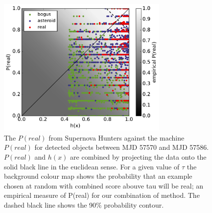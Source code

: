 \documentclass[a4paper,fleqn,usenatbib]{mnras}
\begin{document}
\begin{figure}
   \includegraphics[width=84mm]{figs/human_v_machine_20160712-20160718.pdf}
   \caption{The $P(real)$ from Supernova Hunters against the machine $P(real)$ for detected 
            objects between MJD 57570 and MJD 57586.  $P(real)$ and $h(x)$ are combined by projecting the data onto 
             the solid black line in the euclidean sense.  For a given value of $\tau$ the background colour map
            shows the probability that an example chosen at random with combined score abouve tau will be real; an
            empirical measure of P(real) for our combination of method.  The dashed black line shows the 90\% probability contour.}
   \label{fig:combo_train} 
\end{figure}



\end{document}
